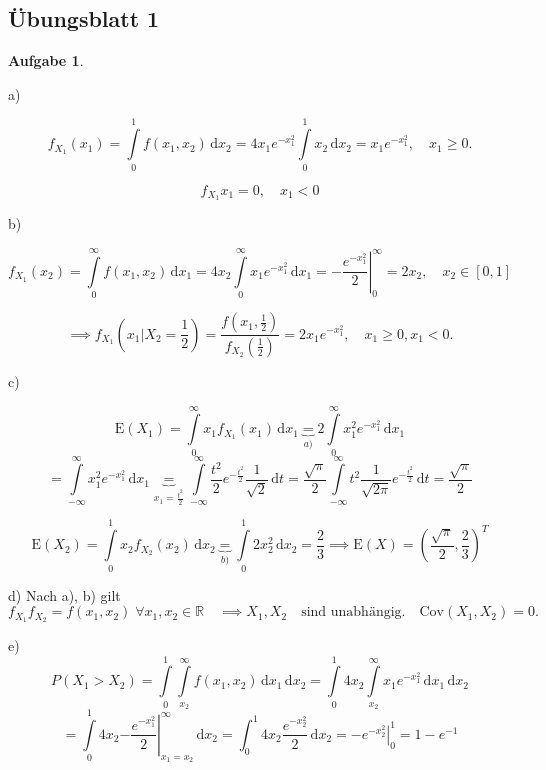 \documentclass[12pt, a4paper]{article}
\newcommand{\E}{\mbox{I\negthinspace E}}
\theoremstyle{plain}
\theoremstyle{definition}
\newtheorem{aufgabe}{Aufgabe}
\newcommand{\R}{\mathbb{R}}
\newcommand{\1}{\mathds{1}}
\renewcommand{\E}{\mathrm{E}}
\newcommand{\Cov}{\mathrm{Cov}}
\renewcommand{\d}{\,\mathrm{d}}
\providecommand{\mtext}[1]{\quad \text{#1} \quad}
\providecommand{\eval}[1]{\left. #1 \right|}
\begin{document}
\newpage


\subsection*{Übungsblatt 1}

\begin{aufgabe} 
\end{aufgabe}

a)

\[  f_{X_1}(x_1) = \int\limits_0^1 f(x_1, x_2) \d x_2 = 4x_1 e^{-x_1^2} \int\limits_0^1 x_2 \d x_2 = x_1 e^{-x_1^2}, \quad x_1 \geq 0.     \]

\[  f_{X_1}x_1 = 0, \quad x_1 < 0     \]

b)

\[  f_{X_1}(x_2) = \int\limits_0^{\infty}f(x_1, x_2) \d x_1 = 4 x_2 \int\limits_0^{\infty} x_1 e^{-x_1^2} \d x_1  = \eval{-\frac{e^{-x_1^2}}{2}}_0^\infty  = 2x_2, \quad x_2 \in [0,1]  \]

\[   \implies f_{X_1}(x_1 | X_2 = \frac{1}{2}) = \frac{f(x_1, \frac{1}{2})}{f_{X_2}(\frac{1}{2})} = 2x_1 e^{-x_1^2}, \quad x_1 \geq 0, x_1 < 0.    \]

c)

\[  \E(X_1) = \int\limits_0^{\infty} x_1 f_{X_1}(x_1) \d x_1 \underbrace{=}_{a)} 2 \int\limits_0^\infty x_1^2 e^{-x_1^2} \d x_1    \]
\[  = \int\limits_{-\infty}^{\infty}  x_1^2 e^{-x_1^2} \d x_1 \underbrace{=}_{x_1 = \frac{t^2}{2}}    \int\limits_{-\infty}^{\infty}  \frac{t^2}{2} e^{-\frac{t^2}{2}}  \frac{1}{\sqrt{2}} \d t =      \frac{\sqrt{\pi}}{2}   \int\limits_{-\infty}^{\infty} t^2 \frac{1}{\sqrt{2\pi}} e^{-\frac{t^2}{2}} \d t = \frac{\sqrt{\pi}}{2}    \]

\[    \E(X_2) =  \int\limits_0^1 x_2 f_{X_2} (x_2) \d x_2 \underbrace{=}_{b)} \int\limits_0^1 2 x_2^2 \d x_2 = \frac{2}{3} \implies \E(X) = \left(\frac{\sqrt{\pi}}{2}, \frac{2}{3}\right)^T     \]

d)
Nach a), b) gilt 
\[  f_{X_1} f_{X_2} = f(x_1, x_2) \; \forall x_1, x_2 \in \R \quad \implies X_1, X_2 \mtext{sind unabhängig.} \Cov(X_1, X_2) = 0.      \]

e)
\[   P(X_1 > X_2) = \int\limits_0^1 \int\limits_{x_2}^\infty f(x_1, x_2) \d x_1  \d x_2  = \int\limits_0^1 4x_2 \int\limits_{x_2}^\infty x_1 e^{-x_1^2} \d x_1 \d x_2    \]
\[  = \int\limits_0^1 4x_2 \eval{ -\frac{e^{-x_1^2}}{2}  }_{x_1 = x_2}^{\infty} \d x_2  = \int_0^1 4x_2 \frac{e^{-x_2^2}}{2} \d x_2 = \eval{-e^{-x_2^2}}_0^1 = 1-e^{-1}    \]\\
\end{document}
